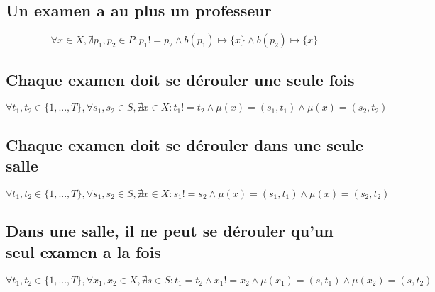 \documentclass[a4paper,10pt]{article}
\begin{document}
\subsection {Un examen a au plus un professeur}
\begin{displaymath}
\forall x \in X, \nexists p_{1},p_{2} \in P: p_{1} != p_{2} \wedge b(p_{1}) \mapsto \{x\} \wedge b(p_{2}) \mapsto \{x\} 
\end{displaymath}
\subsection {Chaque examen doit se dérouler une seule fois}
\begin{displaymath}
\forall t_{1}, t_{2} \in \{1,...,T\},\forall s_{1},s_{2} \in S, \nexists x \in X : t_{1} != t_{2} \wedge \mu(x) = (s_{1},t_{1}) \wedge \mu(x) = (s_{2},t_{2})
\end{displaymath}
\subsection {Chaque examen doit se dérouler dans une seule salle}
\begin{displaymath}
\forall t_{1}, t_{2} \in \{1,...,T\},\forall s_{1},s_{2} \in S, \nexists x \in X : s_{1} != s_{2} \wedge \mu(x) = (s_{1},t_{1}) \wedge \mu(x) = (s_{2},t_{2})
\end{displaymath}	
\subsection {Dans une salle, il ne peut se dérouler qu'un seul examen a la fois}
\begin{displaymath}
\forall t_{1}, t_{2} \in \{1,...,T\},\forall x_{1},x_{2} \in X, \nexists s \in S : t_{1} = t_{2} \wedge x_{1} != x_{2} \wedge \mu(x_{1}) = (s,t_{1}) \wedge \mu(x_{2}) = (s,t_{2})
\end{displaymath}	
\end{document}
